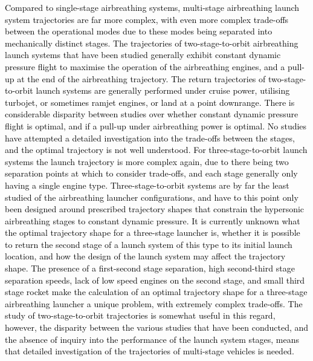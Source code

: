   	   \textcolor{black}{
  	  Compared to single-stage airbreathing systems, multi-stage airbreathing launch system trajectories are far more complex, with even more complex trade-offs between the operational modes due to these modes being separated into mechanically distinct stages\cite{Bulirsch1995}. The trajectories of two-stage-to-orbit airbreathing launch systems that have been studied generally exhibit constant dynamic pressure flight to maximise the operation of the airbreathing engines, and a pull-up at the end of the airbreathing trajectory. The return trajectories of two-stage-to-orbit launch systems are generally performed under cruise power, utilising turbojet, or sometimes ramjet engines\cite{Wilhite1991,Mehta2001,Eklund2012,Bradford2002}, or land at a point downrange\cite{Takahashi1997}. There is considerable disparity between studies over whether constant dynamic pressure flight is optimal, and if a pull-up under airbreathing power is optimal\cite{Wilhite1991,Fujikawa2017,Mehta2001,Takahashi1997,Aberleen,Germain2001,Eklund2012,Bradford2002,Kimura1999,Preller2018a}. No studies have attempted a detailed investigation into the trade-offs between the stages, and the optimal trajectory is not well understood. 
  	   For three-stage-to-orbit launch systems the launch trajectory is more complex again, due to there being two separation points at which to consider trade-offs, and each stage generally only having a single engine type. Three-stage-to-orbit systems are by far the least studied of the airbreathing launcher configurations, and have to this point only been designed around prescribed trajectory shapes that constrain the hypersonic airbreathing stages to constant dynamic pressure\cite{Kimura1999,Preller2018a}. It is currently unknown what the optimal trajectory shape for a three-stage launcher is, whether it is possible to return the second stage of a launch system of this type to its initial launch location, and how the design of the launch system may affect the trajectory shape. The presence of a first-second stage separation, high second-third stage separation speeds, lack of low speed engines on the second stage, and small third stage rocket make the calculation of an optimal trajectory shape for a three-stage airbreathing launcher a unique problem, with extremely complex trade-offs. The study of two-stage-to-orbit trajectories is somewhat useful in this regard, however, the disparity between the various studies that have been conducted, and the absence of inquiry into the performance of the launch system stages, means that detailed investigation of the trajectories of multi-stage vehicles is needed. 
  	}
  	   
